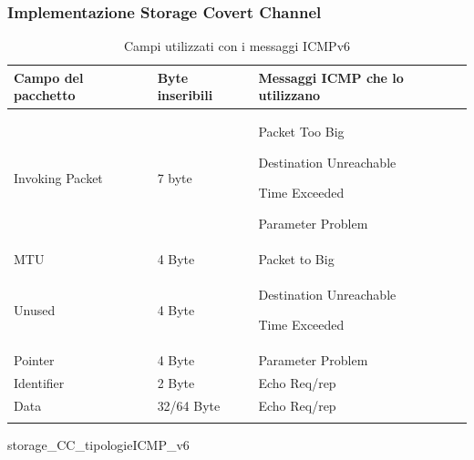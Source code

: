 \begin{frame} [fragile]
\frametitle{Implementazione Storage Covert Channel}
\scriptsize 
\begin{longtable}{|p{}|p{}|p{}|}
    \hline 
    \textbf{Campo del pacchetto} & \textbf{Byte inseribili} & \textbf{Messaggi ICMP che lo utilizzano} 
    \\ \hline 
    Invoking Packet & 7 byte& 
        Packet Too Big\par 
        Destination Unreachable\par
        Time Exceeded\par 
        Parameter Problem 
        \\ \hline 
    MTU & 4 Byte & Packet to Big \\ \hline 
    Unused & 4 Byte & 
        Destination Unreachable\par 
        Time Exceeded 
        \\ \hline 
    Pointer & 4 Byte & Parameter Problem \\ \hline 
    Identifier & 2 Byte & Echo Req/rep \\ \hline 
    Data & 32/64 Byte & Echo Req/rep \\ \hline  
    \caption{Campi utilizzati con i messaggi ICMPv6}  
\end{longtable} 
\end{frame} 
{storage_CC_tipologieICMP_v6} 

